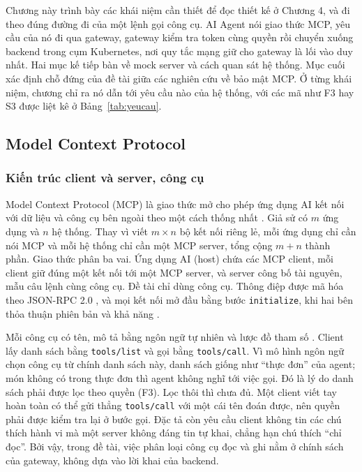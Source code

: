 
Chương này trình bày các khái niệm cần thiết để đọc thiết kế ở Chương 4, và đi theo đúng đường đi của một lệnh gọi công cụ. AI Agent nói giao thức MCP, yêu cầu của nó đi qua gateway, gateway kiểm tra token cùng quyền rồi chuyển xuống backend trong cụm Kubernetes, nơi quy tắc mạng giữ cho gateway là lối vào duy nhất. Hai mục kế tiếp bàn về mock server và cách quan sát hệ thống. Mục cuối xác định chỗ đứng của đề tài giữa các nghiên cứu về bảo mật MCP. Ở từng khái niệm, chương chỉ ra nó dẫn tới yêu cầu nào của hệ thống, với các mã như F3 hay S3 được liệt kê ở Bảng~\ref{tab:yeucau}.

\subsection{Model Context Protocol}

\subsubsection{Kiến trúc client và server, công cụ}

Model Context Protocol (MCP) là giao thức mở cho phép ứng dụng AI kết nối với dữ liệu và công cụ bên ngoài theo một cách thống nhất \parencite{mcp_spec}. Giả sử có $m$ ứng dụng và $n$ hệ thống. Thay vì viết $m \times n$ bộ kết nối riêng lẻ, mỗi ứng dụng chỉ cần nói MCP và mỗi hệ thống chỉ cần một MCP server, tổng cộng $m + n$ thành phần. Giao thức phân ba vai. Ứng dụng AI (host) chứa các MCP client, mỗi client giữ đúng một kết nối tới một MCP server, và server công bố tài nguyên, mẫu câu lệnh cùng công cụ. Đề tài chỉ dùng công cụ. Thông điệp được mã hóa theo JSON-RPC 2.0 \parencite{jsonrpc2}, và mọi kết nối mở đầu bằng bước \texttt{initialize}, khi hai bên thỏa thuận phiên bản và khả năng \parencite{mcp_lifecycle}.

Mỗi công cụ có tên, mô tả bằng ngôn ngữ tự nhiên và lược đồ tham số \parencite{mcp_tools}. Client lấy danh sách bằng \texttt{tools/list} và gọi bằng \texttt{tools/call}. Vì mô hình ngôn ngữ chọn công cụ từ chính danh sách này, danh sách giống như ``thực đơn'' của agent; món không có trong thực đơn thì agent không nghĩ tới việc gọi. Đó là lý do danh sách phải được lọc theo quyền (F3). Lọc thôi thì chưa đủ. Một client viết tay hoàn toàn có thể gửi thẳng \texttt{tools/call} với một cái tên đoán được, nên quyền phải được kiểm tra lại ở bước gọi. Đặc tả còn yêu cầu client không tin các chú thích hành vi mà một server không đáng tin tự khai, chẳng hạn chú thích ``chỉ đọc''. Bởi vậy, trong đề tài, việc phân loại công cụ đọc và ghi nằm ở chính sách của gateway, không dựa vào lời khai của backend.

